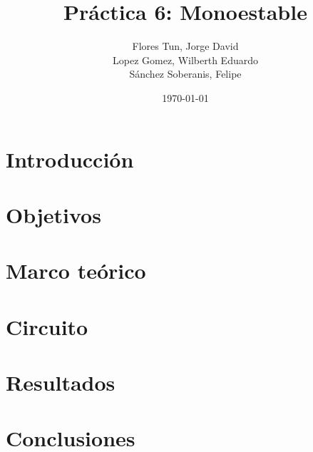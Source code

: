 \documentclass{article}
\title{Práctica 6: Monoestable}
\author{
    Flores Tun, Jorge David \\
    Lopez Gomez, Wilberth Eduardo \\
    Sánchez Soberanis, Felipe
}
\date{\today}
\begin{document}
\maketitle

\tableofcontents


\section{Introducción}
\section{Objetivos}
\section{Marco teórico}
\section{Circuito}
\section{Resultados}
\section{Conclusiones}
\end{document}
